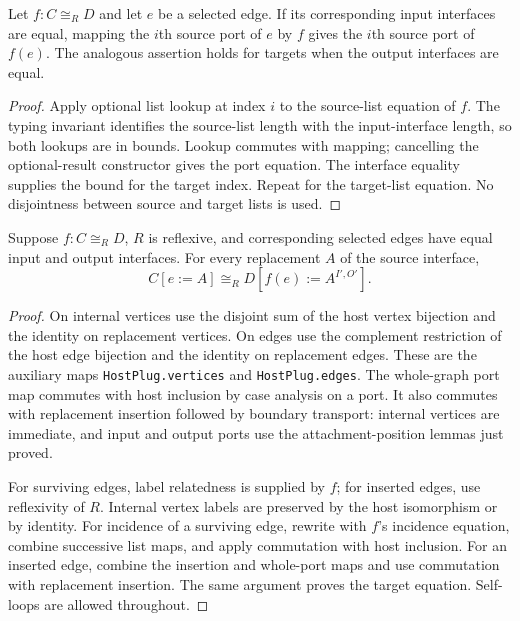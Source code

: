 \begin{lemma}
Let $f:C\cong_R D$ and let $e$ be a selected edge. If its corresponding input
interfaces are equal, mapping the $i$th source port of $e$ by $f$ gives the
$i$th source port of $f(e)$. The analogous assertion holds for targets when the
output interfaces are equal.
\end{lemma}
\begin{proof}
Apply optional list lookup at index $i$ to the source-list equation of $f$.
The typing invariant identifies the source-list length with the input-interface
length, so both lookups are in bounds. Lookup commutes with mapping; cancelling
the optional-result constructor gives the port equation. The interface equality
supplies the bound for the target index. Repeat for the target-list equation.
No disjointness between source and target lists is used.
\end{proof}

\begin{theorem}
Suppose $f:C\cong_R D$, $R$ is reflexive, and corresponding selected edges have
equal input and output interfaces. For every replacement $A$ of the source
interface,
\[
 C[e:=A]\cong_R D[f(e):=A^{I',O'}].
\]
\end{theorem}
\begin{proof}
On internal vertices use the disjoint sum of the host vertex bijection and the
identity on replacement vertices. On edges use the complement restriction of
the host edge bijection and the identity on replacement edges. These are the
auxiliary maps \texttt{HostPlug.vertices} and \texttt{HostPlug.edges}.
The whole-graph port map commutes with host inclusion by case analysis on a
port. It also commutes with replacement insertion followed by boundary
transport: internal vertices are immediate, and input and output ports use the
attachment-position lemmas just proved.

For surviving edges, label relatedness is supplied by $f$; for inserted edges,
use reflexivity of $R$. Internal vertex labels are preserved by the host
isomorphism or by identity. For incidence of a surviving edge, rewrite with
$f$'s incidence equation, combine successive list maps, and apply commutation
with host inclusion. For an inserted edge, combine the insertion and whole-port
maps and use commutation with replacement insertion. The same argument proves
the target equation. Self-loops are allowed throughout.
\end{proof}


